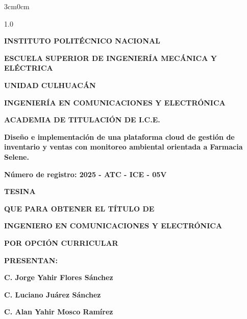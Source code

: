 \begin{titlepage}
\begin{adjustwidth}{3cm}{0cm} 
    \centering
    \begin{spacing}{1.0}
    {\Large \bfseries \MakeUppercase{Instituto Politécnico Nacional}\par}
    \par
    {\normalsize \bfseries \MakeUppercase{Escuela Superior de Ingeniería Mecánica y Eléctrica}\par}
    \vspace{0.3cm}
    {\normalsize \bfseries \MakeUppercase{Unidad Culhuacán}\par}
    {\normalsize \bfseries \MakeUppercase{Ingeniería en Comunicaciones y Electrónica}\par}
    {\normalsize \bfseries \MakeUppercase{Academia de Titulación de I.C.E.}\par}
    \vspace{0.5cm}
    {\Large \bfseries Diseño e implementación de una plataforma cloud de gestión de inventario y ventas con monitoreo ambiental orientada a Farmacia Selene.\par}
    \vspace{0.5cm}
    {\normalsize \bfseries Número de registro: 2025 - ATC - ICE - 05V  \par}
    \vspace{0.5cm}
    {\normalsize \bfseries \MakeUppercase{Tesina}\par}
    \vspace{0.1cm}
    {\normalsize \bfseries \MakeUppercase{Que para obtener el título de}\par}
    {\normalsize \bfseries \MakeUppercase{Ingeniero en Comunicaciones y Electrónica}\par}
    {\normalsize \bfseries \MakeUppercase{Por Opción Curricular}\par}
    \vspace{0.5cm}
    {\normalsize \bfseries \MakeUppercase{Presentan:}\par}
    \vspace{0.1cm}
    {\normalsize \bfseries C. Jorge Yahir Flores Sánchez\par}
    {\normalsize \bfseries C. Luciano Juárez Sánchez\par}
    {\normalsize \bfseries C. Alan Yahir Mosco Ramírez\par}

\end{spacing}
\end{adjustwidth}
\end{titlepage}
